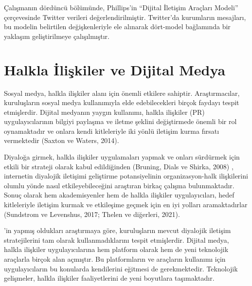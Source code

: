 \documentclass[
]{book}
\begin{document}
Çalışmanın dördüncü bölümünde, Phillips'in ``Dijital İletişim Araçları Modeli'' çerçevesinde Twitter verileri değerlendirilmiştir. Twitter'da kurumların mesajları, bu modelin belirtilen değişkenleriyle ele alınarak dört-model bağlamında bir yaklaşım geliştirilmeye çalışılmıştır.

\hypertarget{halkla-iliux15fkiler-ve-dijital-medya}{%
\section{Halkla İlişkiler ve Dijital Medya}\label{halkla-iliux15fkiler-ve-dijital-medya}}

Sosyal medya, halkla ilişkiler alanı için önemli etkilere sahiptir. Araştırmacılar, kuruluşların sosyal medya kullanımıyla elde edebilecekleri birçok faydayı tespit etmişlerdir. Dijital medyanın yaygın kullanımı, halkla ilişkiler (PR) uygulayıcılarının bilgiyi paylaşma ve iletme şeklini değiştirmede önemli bir rol oynamaktadır \citep{komodromos2014study} ve onlara kendi kitleleriyle iki yönlü iletişim kurma fırsatı vermektedir (Saxton ve Waters, 2014). \citep{saxton2014stakeholders}

Diyaloğa girmek, halkla ilişkiler uygulamaları yapmak ve onları sürdürmek için etkili bir strateji olarak kabul edildiğinden (Bruning, Dials ve Shirka, 2008) \citep{bruning2008using}, internetin diyalojik iletişimi geliştirme potansiyelinin organizasyon-halk ilişkilerini olumlu yönde nasıl etkileyebileceğini araştıran birkaç çalışma bulunmaktadır. \citep{kelleher2009conversational, kent1998building} Sonuç olarak hem akademisyenler hem de halkla ilişkiler uygulayıcıları, hedef kitleleriyle iletişim kurmak ve etkileşime geçmek için en iyi yolları aramaktadırlar (Sundstrom ve Levenshus, 2017; Thelen ve diğerleri, 2021). \citep{sundstrom2017art}

\citet{rybalko2010dialogic} 'in yapmış oldukları araştırmaya göre, kuruluşların mevcut diyalojik iletişim stratejilerini tam olarak kullanmadıklarını tespit etmişlerdir. \citep{burnap2015} Dijital medya, halkla ilişkiler uygulayıcılarına hem platform olarak hem de yeni teknolojik araçlarla birçok alan açmıştır. Bu platformların ve araçların kullanımı için uygulayıcıların bu konularda kendilerini eğitmesi de gerekmektedir. Teknolojik gelişmeler, halkla ilişkiler faaliyetlerini de yeni boyutlara taşımaktadır.
\end{document}
